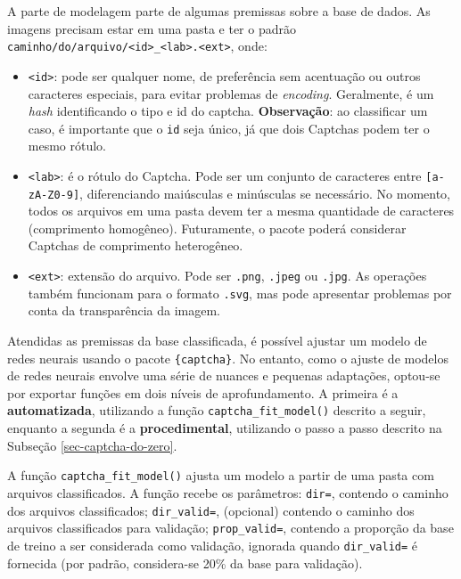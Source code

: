 \documentclass[12pt,twoside,brazilian]{book}
\providecommand{\tightlist}{%
  \setlength{\itemsep}{0pt}\setlength{\parskip}{0pt}}
\begin{document}
A parte de modelagem parte de algumas premissas sobre a base de dados.
As imagens precisam estar em uma pasta e ter o padrão
\texttt{caminho/do/arquivo/\textless{}id\textgreater{}\_\textless{}lab\textgreater{}.\textless{}ext\textgreater{}},
onde:

\begin{itemize}
\tightlist
\item
  \texttt{\textless{}id\textgreater{}}: pode ser qualquer nome, de
  preferência sem acentuação ou outros caracteres especiais, para evitar
  problemas de \emph{encoding}. Geralmente, é um \emph{hash}
  identificando o tipo e id do captcha. \textbf{Observação}: ao
  classificar um caso, é importante que o \texttt{id} seja único, já que
  dois Captchas podem ter o mesmo rótulo.
\item
  \texttt{\textless{}lab\textgreater{}}: é o rótulo do Captcha. Pode ser
  um conjunto de caracteres entre \texttt{{[}a-zA-Z0-9{]}},
  diferenciando maiúsculas e minúsculas se necessário. No momento, todos
  os arquivos em uma pasta devem ter a mesma quantidade de caracteres
  (comprimento homogêneo). Futuramente, o pacote poderá considerar
  Captchas de comprimento heterogêneo.
\item
  \texttt{\textless{}ext\textgreater{}}: extensão do arquivo. Pode ser
  \texttt{.png}, \texttt{.jpeg} ou \texttt{.jpg}. As operações também
  funcionam para o formato \texttt{.svg}, mas pode apresentar problemas
  por conta da transparência da imagem.
\end{itemize}

Atendidas as premissas da base classificada, é possível ajustar um
modelo de redes neurais usando o pacote \texttt{\{captcha\}}. No
entanto, como o ajuste de modelos de redes neurais envolve uma série de
nuances e pequenas adaptações, optou-se por exportar funções em dois
níveis de aprofundamento. A primeira é a \textbf{automatizada},
utilizando a função \texttt{captcha\_fit\_model()} descrito a seguir,
enquanto a segunda é a \textbf{procedimental}, utilizando o passo a
passo descrito na Subseção \ref{sec-captcha-do-zero}.

A função \texttt{captcha\_fit\_model()} ajusta um modelo a partir de uma
pasta com arquivos classificados. A função recebe os parâmetros:
\texttt{dir=}, contendo o caminho dos arquivos classificados;
\texttt{dir\_valid=}, (opcional) contendo o caminho dos arquivos
classificados para validação; \texttt{prop\_valid=}, contendo a
proporção da base de treino a ser considerada como validação, ignorada
quando \texttt{dir\_valid=} é fornecida (por padrão, considera-se 20\%
da base para validação).
\end{document}
